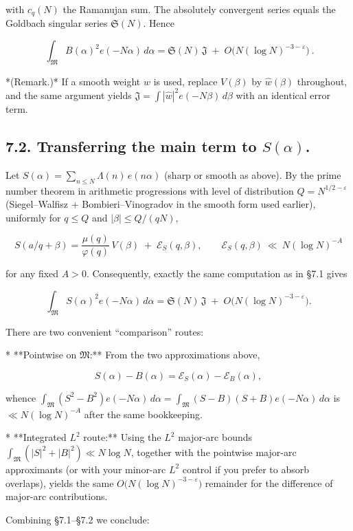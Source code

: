 \documentclass[11pt]{article}
\theoremstyle{definition}
\theoremstyle{remark}
\begin{document}
with $c_q(N)$ the Ramanujan sum. The absolutely convergent series equals the Goldbach singular series $\mathfrak S(N)$. Hence

$$
\boxed{\ \ \int_{\mathfrak M} B(\alpha)^2 e(-N\alpha)\,d\alpha
=\mathfrak S(N)\,\mathfrak J\;+\;O\!\big(N(\log N)^{-3-\varepsilon}\big)\ .\ }
$$

*(Remark.)* If a smooth weight $w$ is used, replace $V(\beta)$ by $\widehat w(\beta)$ throughout, and the same argument yields $\mathfrak J=\int|\widehat w|^2 e(-N\beta)\,d\beta$ with an identical error term.

\subsection*{7.2. Transferring the main term to $S(\alpha)$.}

Let $S(\alpha)=\sum_{n\le N}\Lambda(n)\,e(n\alpha)$ (sharp or smooth as above). By the prime number theorem in arithmetic progressions with level of distribution $Q=N^{1/2-\varepsilon}$ (Siegel–Walfisz + Bombieri–Vinogradov in the smooth form used earlier), uniformly for $q\le Q$ and $|\beta|\le Q/(qN)$,

$$
S(a/q+\beta)=\frac{\mu(q)}{\varphi(q)}\,V(\beta) \;+\; \mathcal E_S(q,\beta),
\qquad \mathcal E_S(q,\beta)\ \ll\ N(\log N)^{-A}
$$

for any fixed $A>0$. Consequently, exactly the same computation as in §7.1 gives

$$
\int_{\mathfrak M} S(\alpha)^2 e(-N\alpha)\,d\alpha
=\mathfrak S(N)\,\mathfrak J\;+\;O\!\big(N(\log N)^{-3-\varepsilon}\big).
$$

There are two convenient “comparison” routes:

* **Pointwise on $\mathfrak M$:** From the two approximations above,

  $$
  S(\alpha)-B(\alpha)=\mathcal E_S(\alpha)-\mathcal E_B(\alpha),
  $$

  whence $\int_{\mathfrak M}(S^2-B^2)e(-N\alpha)\,d\alpha =\int_{\mathfrak M}(S-B)(S+B)e(-N\alpha)\,d\alpha$
  is $\ll N(\log N)^{-A}$ after the same bookkeeping.

* **Integrated $L^2$ route:** Using the $L^2$ major-arc bounds $\int_{\mathfrak M}(|S|^2+|B|^2)\ll N\log N$, together with the pointwise major-arc approximants (or with your minor-arc $L^2$ control if you prefer to absorb overlaps), yields the same $O\big(N(\log N)^{-3-\varepsilon}\big)$ remainder for the difference of major-arc contributions.

Combining §7.1–§7.2 we conclude:
\end{document}

